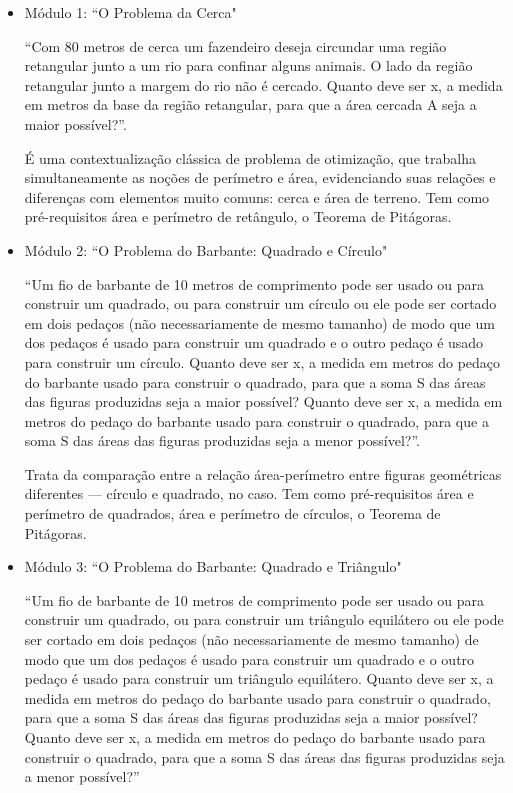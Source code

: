 \begin{itemize}
    \item Módulo 1: ``O Problema da Cerca"
    
    ``Com 80 metros de cerca um fazendeiro deseja circundar uma região retangular junto a um rio para confinar alguns animais. O lado da região retangular junto a margem do rio não é cercado. Quanto deve ser x, a medida em metros da base da região retangular, para que a área cercada A seja a maior possível?”.
    
    É uma contextualização clássica de problema de otimização, que trabalha simultaneamente as noções de perímetro e área, evidenciando suas relações e diferenças com elementos muito comuns: cerca e área de terreno. Tem como pré-requisitos área e perímetro de retângulo, o Teorema de Pitágoras.
    
    
    \item Módulo 2: ``O Problema do Barbante: Quadrado e Círculo"
    
    ``Um fio de barbante de 10 metros de comprimento pode ser usado ou para construir um quadrado, ou para construir um círculo ou ele pode ser cortado em dois pedaços (não necessariamente de mesmo tamanho) de modo que um dos pedaços é usado para construir um quadrado e o outro pedaço é usado para construir um círculo. Quanto deve ser x, a medida em metros do pedaço do barbante usado para construir o quadrado, para que a soma S das áreas das figuras produzidas seja a maior possível? Quanto deve ser x, a medida em metros do pedaço do barbante usado para construir o quadrado, para que a soma S das áreas das figuras produzidas seja a menor possível?”.

    Trata da comparação entre a relação área-perímetro entre figuras geométricas diferentes --- círculo e quadrado, no caso. Tem como pré-requisitos área e perímetro de quadrados, área e perímetro de círculos, o Teorema de Pitágoras. 
    
    \item Módulo 3: ``O Problema do Barbante: Quadrado e Triângulo"
    
    ``Um fio de barbante de 10 metros de comprimento pode ser usado ou para construir um quadrado, ou para construir um triângulo equilátero ou ele pode ser cortado em dois pedaços (não necessariamente de mesmo tamanho) de modo que um dos pedaços é usado para construir um quadrado e o outro pedaço é usado para construir um triângulo equilátero. Quanto deve ser x, a medida em metros do pedaço do barbante usado para construir o quadrado, para que a soma S das áreas das figuras produzidas seja a maior possível? Quanto deve ser x, a medida em metros do pedaço do barbante usado para construir o quadrado, para que a soma S das áreas das figuras produzidas seja a menor possível?”
    

\end{itemize}

